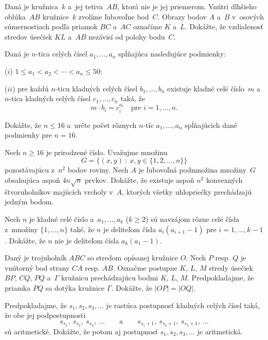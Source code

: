 {%
Daná je kružnica~$k$ a~jej tetiva~$AB$, ktorá nie je jej priemerom. Vnútri dlhšieho oblúka~$AB$ kružnice~$k$ zvolíme ľubovoľne bod~$C$. Obrazy bodov $A$ a~$B$ v~osových súmernostiach podľa priamok $BC$ a~$AC$ označíme $K$ a~$L$. Dokážte, že vzdialenosť stredov úsečiek $KL$ a~$AB$ nezávisí od polohy bodu~$C$.}

{%
Daná je $n$-tica celých čísel $a_1,\dots,a_n$ spĺňajúca nasledujúce podmienky:
\item{($i$)} $1\le a_1<a_2<\cdots<a_n\le 50$;
\item{($ii$)} pre každú $n$-ticu kladných celých čísel $b_1,\dots,b_n$ existuje kladné celé číslo~$m$ a~$n$-tica kladných celých čísel $c_1,\dots,c_n$ taká, že
$$
  m\cdot b_i=c_i^{a_i}\quad\text{pre $i=1,\dots,n$.}
$$

Dokážte, že $n\le16$ a~určte počet rôznych $n$-tíc $a_1,\dots,a_n$ spĺňajúcich dané podmienky pre $n=16$.}

{%
Nech $n\ge16$ je prirodzené číslo. Uvažujme množinu
$$
G = \bigl\{(x,y)\ :\ x,y\in\{1,2,\dots,n\}\bigr\}
$$
pozostávajúcu z~$n^2$ bodov roviny. Nech $A$ je ľubovoľná podmnožina množiny~$G$ obsahujúca aspoň $4n\sqrt{n}$ prvkov. Dokážte, že existuje aspoň $n^2$ konvexných štvoruholníkov majúcich vrcholy v~$A$, ktorých všetky uhlopriečky prechádzajú jedným bodom.}

{%
Nech $n$ je kladné celé číslo a~$a_1,\dots,a_k$ ($k\ge 2$) sú navzájom rôzne celé čísla z~množiny $\{1,\dots,n\}$ také, že $n$ je deliteľom čísla $a_i(a_{i+1}-1)$ pre $i=1,\dots,k-1$.
Dokážte, že $n$ nie je deliteľom čísla $a_k(a_1-1)$.}

{%
Daný je trojuholník $ABC$ so stredom opísanej kružnice $O$.
Nech $P$ resp. $Q$ je vnútorný bod strany $CA$ resp. $AB$.
Označme postupne $K$, $L$, $M$ stredy úsečiek $BP$, $CQ$, $PQ$ a~$\Gamma$ kružnicu prechádzajúcu bodmi $K$, $L$, $M$.
Predpokladajme, že priamka $PQ$ sa dotýka kružnice $\Gamma$. Dokážte, že $|OP|=|OQ|$.}

{%
Predpokladajme, že $s_1,s_2,s_3,\dots$ je rastúca postupnosť kladných celých čísel taká, že obe jej podpostupnosti
$$
s_{s_1},\ s_{s_2},\ s_{s_3},\ \dots\qquad\text{a}\qquad s_{s_1+1},\ s_{s_2+1},\ s_{s_3+1},\ \dots
$$
sú aritmetické.
Dokážte, že potom aj postupnosť $s_1, s_2, s_3, \dots$ je aritmetická.}

